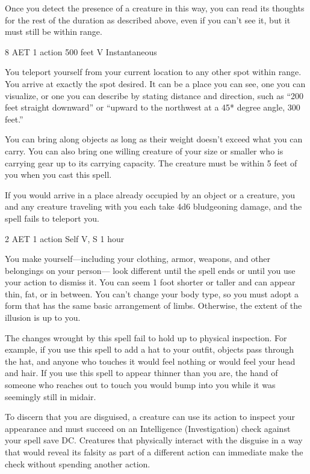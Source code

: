 Once you detect the presence of a creature in this way, you can read its thoughts for the rest of the duration as described above, even if you can't see it, but it must still be within range.


{8 AET}
{1 action}
{500 feet}
{V}
{Instantaneous}

You teleport yourself from your current location to any other spot within range. You arrive at exactly the spot desired. It can be a place you can see, one you can visualize, or one you can describe by stating distance and direction, such as “200 feet straight downward” or “upward to the northwest at a 45* degree angle, 300 feet.”

You can bring along objects as long as their weight doesn't exceed what you can carry. You can also bring one willing creature of your size or smaller who is carrying gear up to its carrying capacity. The creature must be within 5 feet of you when you cast this spell.

If you would arrive in a place already occupied by an object or a creature, you and any creature traveling with you each take 4d6 bludgeoning damage, and the spell fails to teleport you.


{2 AET}
{1 action}
{Self}
{V, S}
{1 hour}

You make yourself—including your clothing, armor, weapons, and other belongings on your person— look different until the spell ends or until you use your action to dismiss it. You can seem 1 foot shorter or taller and can appear thin, fat, or in between. You can't change your body type, so you must adopt a form that has the same basic arrangement of limbs. Otherwise, the extent of the illusion is up to you.

The changes wrought by this spell fail to hold up to physical inspection. For example, if you use this spell to add a hat to your outfit, objects pass through the hat, and anyone who touches it would feel nothing or would feel your head and hair. If you use this spell to appear thinner than you are, the hand of someone who reaches out to touch you would bump into you while it was seemingly still in midair.

To discern that you are disguised, a creature can use its action to inspect your appearance and must succeed on an Intelligence (Investigation) check against your spell save DC. Creatures that physically interact with the disguise in a way that would reveal its falsity as part of a different action can immediate make the check without spending another action.


